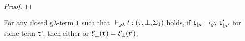 \begin{proof}
%
 \end{proof}



\theoremstyle{remark}

\begin{lemma}
For any closed g$\lambda$-term \texttt{t} such that
$\typrule{t}{\tau}{\bot}{\Sigma_1}$ holds, 
if	$\texttt{t}_{|\mu} \rightarrow_{g\lambda} \texttt{t}'_{|\mu'}$ 
for some term \texttt{t}', 
then either 
or 		$\mathcal{E}_{\bot}(\texttt{t}) = \mathcal{E}_{\bot}(t')$. 
\end{lemma}

